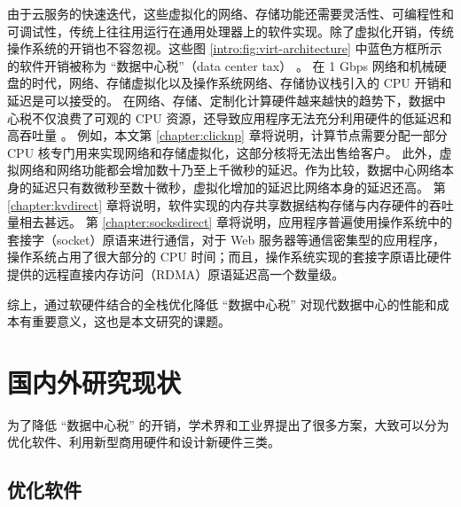 由于云服务的快速迭代，这些虚拟化的网络、存储功能还需要灵活性、可编程性和可调试性，传统上往往用运行在通用处理器上的软件实现。除了虚拟化开销，传统操作系统的开销也不容忽视。这些图 \ref{intro:fig:virt-architecture} 中蓝色方框所示的软件开销被称为 ``数据中心税''（data center tax） \cite{barroso2009datacenter,barroso2013datacenter,barroso2018datacenter}。
在 1 Gbps 网络和机械硬盘的时代，网络、存储虚拟化以及操作系统网络、存储协议栈引入的 CPU 开销和延迟是可以接受的。
在网络、存储、定制化计算硬件越来越快的趋势下，数据中心税不仅浪费了可观的 CPU 资源，还导致应用程序无法充分利用硬件的低延迟和高吞吐量 \cite{barroso2017attack}。
例如，本文第 \ref{chapter:clicknp} 章将说明，计算节点需要分配一部分 CPU 核专门用来实现网络和存储虚拟化，这部分核将无法出售给客户。
此外，虚拟网络和网络功能都会增加数十乃至上千微秒的延迟。作为比较，数据中心网络本身的延迟只有数微秒至数十微秒，虚拟化增加的延迟比网络本身的延迟还高。
第 \ref{chapter:kvdirect} 章将说明，软件实现的内存共享数据结构存储与内存硬件的吞吐量相去甚远。
第 \ref{chapter:socksdirect} 章将说明，应用程序普遍使用操作系统中的套接字（socket）原语来进行通信，对于 Web 服务器等通信密集型的应用程序，操作系统占用了很大部分的 CPU 时间；而且，操作系统实现的套接字原语比硬件提供的远程直接内存访问（RDMA）原语延迟高一个数量级。

综上，通过软硬件结合的全栈优化降低 ``数据中心税'' 对现代数据中心的性能和成本有重要意义，这也是本文研究的课题。





\section{国内外研究现状}

为了降低 ``数据中心税'' 的开销，学术界和工业界提出了很多方案，大致可以分为优化软件、利用新型商用硬件和设计新硬件三类。

\subsection{优化软件}
\label{background:sec:software}

